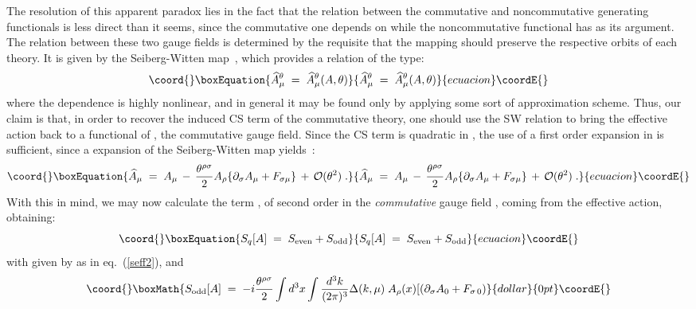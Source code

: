 \documentclass[a4paper,12pt]{article}
\begin{document}
The resolution of this apparent paradox lies in the fact that the
relation between the commutative and noncommutative generating
functionals is less direct than it seems, since the commutative one
depends on \coordHE{} while the noncommutative functional has \coordHE{} as its argument.  The relation between these two gauge
fields is determined by the requisite that the mapping should preserve
the respective orbits of each theory. It is given by the
Seiberg-Witten map~\cite{seibergwitten}, which provides a relation of
the type:
\begin{equation}\coord{}\boxEquation{
{\widehat A}^\theta_\mu \;=\; {\widehat A}^\theta_\mu(A,\theta)
}{
{\widehat A}^\theta_\mu \;=\; {\widehat A}^\theta_\mu(A,\theta)
}{ecuacion}\coordE{}\end{equation}
where the dependence is highly nonlinear, and in general it may be
found only by applying some sort of approximation scheme. Thus, our
claim is that, in order to recover the induced CS term of the
commutative theory, one should use the SW relation to bring the
effective action back to a functional of \coordHE{}, the commutative gauge
field. Since the CS term is quadratic in \coordHE{}, the use of a first
order expansion in \myHighlight{$\theta$}\coordHE{} is sufficient, since a \myHighlight{$\theta$}\coordHE{} expansion of the
Seiberg-Witten map yields~\cite{seibergwitten,bichletal}:
\begin{equation}\coord{}\boxEquation{
\widehat{A}_\mu \;=\; A_\mu \,-\, \frac{\theta^{\rho\sigma}}{2} A_\rho 
\{\partial_\sigma A_\mu + F_{\sigma\mu} \}\,+\,{\mathcal O}(\theta^2) \;.
}{
\widehat{A}_\mu \;=\; A_\mu \,-\, \frac{\theta^{\rho\sigma}}{2} A_\rho 
\{\partial_\sigma A_\mu + F_{\sigma\mu} \}\,+\,{\mathcal O}(\theta^2) \;.
}{ecuacion}\coordE{}\end{equation}
With this in mind, we may now calculate the term \coordHE{},  of second order 
in the {\em commutative\/} gauge field \coordHE{}, coming from the  effective action, 
obtaining:
\begin{equation}\coord{}\boxEquation{
S_q[A]\;=\; S_{\mathrm{even}} + S_{\mathrm{odd}}
}{
S_q[A]\;=\; S_{\mathrm{even}} + S_{\mathrm{odd}}
}{ecuacion}\coordE{}\end{equation}
with \coordHE{} given by \coordHE{} as in eq.~(\ref{seff2}),
 and
%
$$\coord{}\boxMath{
S_{\mathrm{odd}}[A] \;=\; -i \frac{\theta ^ {\rho \sigma}}{2}  
\int d^3x \int \frac{d^3k}{(2\pi)^3} \Delta (k,\mu)\;
A_\rho(x) [ (\partial_\sigma A_0 +F_{\sigma\,0})
}{dollar}{0pt}\coordE{}$$
\end{document}
